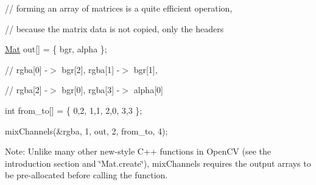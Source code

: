 {\ttfamily }

{\ttfamily }

{\ttfamily // forming an array of matrices is a quite efficient operation,}

{\ttfamily }

{\ttfamily }

{\ttfamily // because the matrix data is not copied, only the headers}

{\ttfamily }

{\ttfamily }

{\ttfamily \mbox{\hyperlink{classorg_1_1opencv_1_1core_1_1_mat}{Mat}} out\mbox{[}\mbox{]} = \{ bgr, alpha \};}

{\ttfamily }

{\ttfamily }

{\ttfamily // rgba\mbox{[}0\mbox{]} -\/$>$ bgr\mbox{[}2\mbox{]}, rgba\mbox{[}1\mbox{]} -\/$>$ bgr\mbox{[}1\mbox{]},}

{\ttfamily }

{\ttfamily }

{\ttfamily // rgba\mbox{[}2\mbox{]} -\/$>$ bgr\mbox{[}0\mbox{]}, rgba\mbox{[}3\mbox{]} -\/$>$ alpha\mbox{[}0\mbox{]}}

{\ttfamily }

{\ttfamily }

{\ttfamily int from\+\_\+to\mbox{[}\mbox{]} = \{ 0,2, 1,1, 2,0, 3,3 \};}

{\ttfamily }

{\ttfamily }

{\ttfamily mix\+Channels(\&rgba, 1, out, 2, from\+\_\+to, 4);}

{\ttfamily }

{\ttfamily }

{\ttfamily Note\+: Unlike many other new-\/style C++ functions in Open\+CV (see the introduction section and \char`\"{}\+Mat.\+create\char`\"{}), {\ttfamily mix\+Channels} requires the output arrays to be pre-\/allocated before calling the function. }


